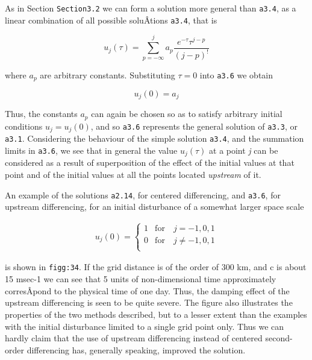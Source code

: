 As in Section \texttt{Section3.2} we can form a solution more general
than \texttt{a3.4}, as a linear combination of all possible soluÂ­tions
\texttt{a3.4}, that is

 {\[u_{j}\left( \tau \right) = \sum_{p = - \infty}^{j}a_{p}\frac{e^{- \tau}\tau^{j - p}}{\left( j - p \right)^{!}}\]}

where \(a_{p}\) are arbitrary constants. Substituting \(\tau = 0\) into
\texttt{a3.6} we obtain

 {\[u_{j}\left( 0 \right) = a_{j}\]}

Thus, the constants \(a_{p}\) can again be chosen so as to satisfy
arbitrary initial conditions \(u_{j} = u_{j}(0)\), and so \texttt{a3.6}
represents the general solution of \texttt{a3.3}, or \texttt{a3.1}.
Considering the behaviour of the simple solution \texttt{a3.4}, and the
summation limits in \texttt{a3.6}, we see that in general the value
\(u_{j}\left( \tau \right)\) at a point \emph{j} can be considered as a
result of superposition of the effect of the initial values at that
point and of the initial values at all the points located
\emph{upstream} of it.

An example of the solutions \texttt{a2.14}, for centered differencing,
and \texttt{a3.6}, for upstream differencing, for an initial disturbance
of a somewhat larger space scale

\[\begin{aligned}
   u_{j}(0) = \left\{ \begin{array}{cc}
                       1  &\textrm{for} \quad j = -1,0,1\\
                       0  &\textrm{for} \quad j \neq -1,0,1\\
   \end{array} \right.
\end{aligned}\]

is shown in \texttt{figg:34}. If the grid distance is of the order of
300 km, and c is about 15 msec-1 we can see that 5 units of
non-dimensional time approximately corresÂ­pond to the physical time of
one day. Thus, the damping effect of the upstream differencing is seen
to be quite severe. The figure also illustrates the properties of the
two methods described, but to a lesser extent than the examples with the
initial disturbance limited to a single grid point only. Thus we can
hardly claim that the use of upstream differencing instead of centered
second-order differencing has, generally speaking, improved the
solution.

